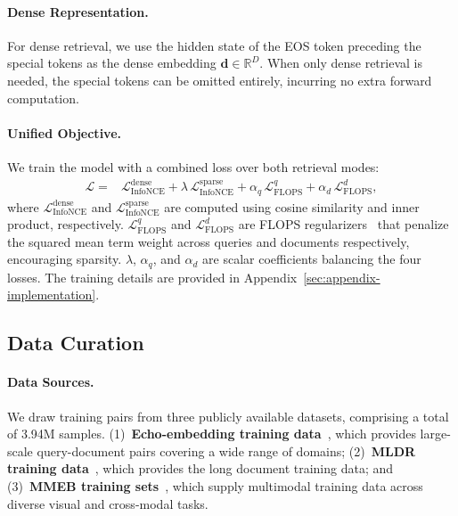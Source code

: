 \paragraph{Dense Representation.}
For dense retrieval, we use the hidden state of the EOS token preceding the special tokens as the dense embedding $\bm{d} \in \mathbb{R}^{D}$. When only dense retrieval is needed, the special tokens can be omitted entirely, incurring no extra forward computation.

\paragraph{Unified Objective.}
We train the model with a combined loss over both retrieval modes:
\begin{equation}\label{eq:total-loss}
\begin{split}
\mathcal{L} ={} & \mathcal{L}_{\text{InfoNCE}}^{\text{dense}} + \lambda\, \mathcal{L}_{\text{InfoNCE}}^{\text{sparse}}  + \alpha_{q}\, \mathcal{L}_{\text{FLOPS}}^{q} + \alpha_{d}\, \mathcal{L}_{\text{FLOPS}}^{d},
\end{split}
\end{equation}
where $\mathcal{L}_{\text{InfoNCE}}^{\text{dense}}$ and $\mathcal{L}_{\text{InfoNCE}}^{\text{sparse}}$ are computed using cosine similarity and inner product, respectively.
$\mathcal{L}_{\text{FLOPS}}^{q}$ and $\mathcal{L}_{\text{FLOPS}}^{d}$ are FLOPS regularizers~\citep{paria2020flops} that penalize the squared mean term weight across queries and documents respectively, encouraging sparsity.
$\lambda$, $\alpha_{q}$, and $\alpha_{d}$ are scalar coefficients balancing the four losses. The training details are provided in Appendix~\ref{sec:appendix-implementation}.

\subsection{Data Curation}\label{sec:data}

\paragraph{Data Sources.}
We draw training pairs from three publicly available datasets, comprising a total of 3.94M samples. 
(1)~\textbf{Echo-embedding training data}~\citep{echoemb}, which provides large-scale query-document pairs covering a wide range of domains;
(2)~\textbf{MLDR training data}~\citep{bgem3}, which provides the long document training data; and
(3)~\textbf{MMEB training sets}~\citep{vlm2vecv2}, which supply multimodal training data across diverse visual and cross-modal tasks. 

